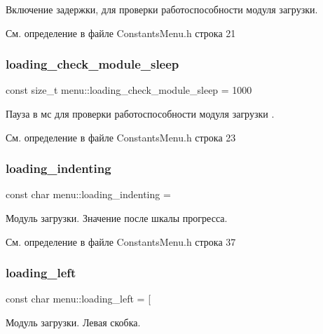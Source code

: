 Включение задержки, для проверки работоспособности модуля загрузки. 

См. определение в файле Constants\+Menu.\+h строка 21

\mbox{\label{namespacemenu_a69bce854c4a150920a5c77eede8cab0a}} 
\subsubsection{\texorpdfstring{loading\+\_\+check\+\_\+module\+\_\+sleep}{loading\_check\_module\_sleep}}
{\footnotesize\ttfamily const size\+\_\+t menu\+::loading\+\_\+check\+\_\+module\+\_\+sleep = 1000}

Пауза в мс для проверки работоспособности модуля загрузки . 

См. определение в файле Constants\+Menu.\+h строка 23

\mbox{\label{namespacemenu_ad004c327a8a1c14388a6c7f23d6953a6}} 
\subsubsection{\texorpdfstring{loading\+\_\+indenting}{loading\_indenting}}
{\footnotesize\ttfamily const char menu\+::loading\+\_\+indenting = \textquotesingle{} \textquotesingle{}}

Модуль загрузки. Значение после шкалы прогресса. 

См. определение в файле Constants\+Menu.\+h строка 37

\mbox{\label{namespacemenu_a56af6a2d586e2b6baa4ebf128a690266}} 
\subsubsection{\texorpdfstring{loading\+\_\+left}{loading\_left}}
{\footnotesize\ttfamily const char menu\+::loading\+\_\+left = \textquotesingle{}\mbox{[}\textquotesingle{}}

Модуль загрузки. Левая скобка. 

